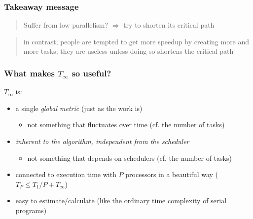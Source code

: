 \documentclass[12pt,dvipdfmx]{beamer}
\newcommand{\ao}[1]{{\color{blue}#1}}
\newcommand{\aka}[1]{{\color{red}#1}}
\begin{document}
  
\begin{frame}
\frametitle{Takeaway message}

\begin{quote}
{\Large Suffer from low parallelism?
$\Rightarrow$
\ao{try to shorten its critical path}}
\end{quote}

{\small
\begin{quote}
in contrast, people are tempted to get more speedup 
by creating \aka{more and more tasks}; 
they are useless unless doing so shortens the 
critical path
\end{quote}}

\begin{center}
\def\svgwidth{0.6\textwidth}
{\scriptsize }
\end{center}

\end{frame}





\begin{frame}
\frametitle{What makes $T_\infty$ so useful?}
$T_\infty$ is:
\begin{itemize}
\item a single \ao{\em global metric} (just as the work is)
  \begin{itemize}
  \item not something that fluctuates over time
    (cf. the number of tasks)
  \end{itemize}

\item \ao{\em inherent to the algorithm,
    independent from the scheduler}
  \begin{itemize}
  \item not something that depends on schedulers
    (cf. the number of tasks)
  \end{itemize}

\item connected to execution time with $P$
  processors in a beautiful way (\ao{$T_P \leq T_1/P
  + T_\infty$})

\item \ao{easy to estimate/calculate}
  (like the ordinary time complexity of serial programs)
\end{itemize}

\end{frame}

\end{document}
